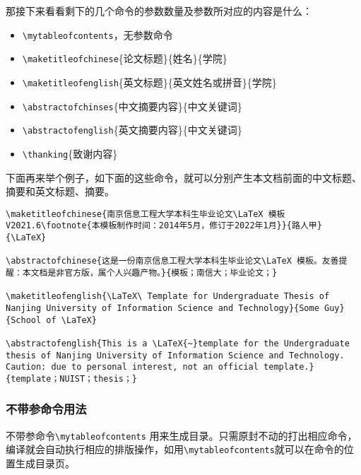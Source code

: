 那接下来看看剩下的几个命令的参数数量及参数所对应的内容是什么：

{
\color{blue}
\begin{itemize}
    \item \verb|\mytableofcontents|，无参数命令
    \item \verb|\maketitleofchinese|\{论文标题\}\{姓名\}\{学院\}
    \item \verb|\maketitleofenglish|\{英文标题\}\{英文姓名或拼音\}\{学院\}
    \item \verb|\abstractofchinses|\{中文摘要内容\}\{中文关键词\}
    \item \verb|\abstractofenglish|\{英文摘要内容\}\{中文关键词\}
    \item \verb|\thanking|\{致谢内容\}
\end{itemize}
}

下面再来举个例子，如下面的这些命令，就可以分别产生本文档前面的中文标题、摘要和英文标题、摘要。

{
\color{green!50!black}
\begin{lstlisting}[breaklines=true,]
\maketitleofchinese{南京信息工程大学本科生毕业论文\LaTeX 模板V2021.6\footnote{本模板制作时间：2014年5月，修订于2022年1月}}{路人甲}{\LaTeX}

\abstractofchinese{这是一份南京信息工程大学本科生毕业论文\LaTeX 模板。友善提醒：本文档是非官方版，属个人兴趣产物。}{模板；南信大；毕业论文；}
    
\maketitleofenglish{\LaTeX\ Template for Undergraduate Thesis of Nanjing University of Information Science and Technology}{Some Guy}{School of \LaTeX}
    
\abstractofenglish{This is a \LaTeX{~}template for the Undergraduate thesis of Nanjing University of Information Science and Technology. Caution: due to personal interest, not an official template.}{template；NUIST；thesis；}
\end{lstlisting}
}

\subsubsection{不带参命令用法}

不带参命令\verb|\mytableofcontents| 用来生成目录。只需原封不动的打出相应命令，编译就会自动执行相应的排版操作，如用\verb|\mytableofcontents|就可以在命令的位置生成目录页。
